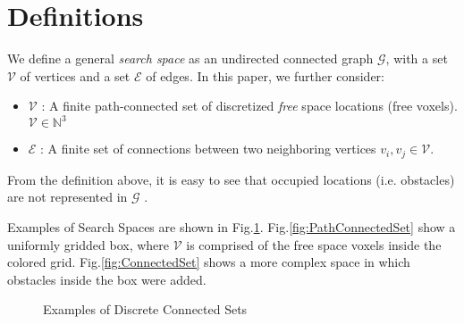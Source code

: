 \documentclass[graybox]{svmult}
\newcommand{\Graph}{\ensuremath{\mathcal G} }
\newcommand{\VertexSet}{\ensuremath{\mathcal V} }
\newcommand{\EdgeSet}{\ensuremath{\mathcal E} }
\begin{document}
\section{Definitions}
\label{sec:Definitions}

\begin{definition}
\label{def:SearchSpace}
We define a general \emph{search space} as an undirected connected graph $\Graph$, with a set \VertexSet of vertices and a set \EdgeSet of edges. In this paper, we further consider: 
\begin{itemize}
\item{\VertexSet: A finite path-connected set of discretized \emph{free} space locations (free voxels). $\VertexSet \in \mathbb{N}^{3}$ }
\item{\EdgeSet: A finite set of connections between two neighboring vertices $v_{i}, v_{j} \in \VertexSet$. }
\end{itemize} 
From the definition above, it is easy to see that occupied locations (i.e. obstacles) are not represented in \Graph. 
\end{definition}

Examples of Search Spaces are shown in Fig.\ref{fig:DiscreteSets}.  Fig.\ref{fig:PathConnectedSet} show a uniformly gridded box, where $\VertexSet$ is comprised of the free space voxels inside the colored grid. Fig.\ref{fig:ConnectedSet} shows a more complex space in which obstacles inside the box were added.

\begin{figure}[]
		\centering
          \caption{Examples of Discrete Connected Sets}
          \label{fig:DiscreteSets}
\end{figure}
\end{document}
